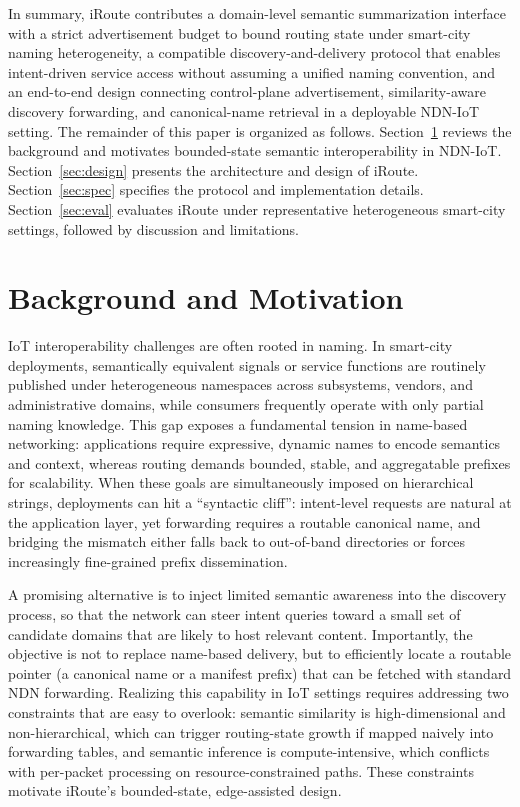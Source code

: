 \documentclass[journal]{IEEEtran}
\newcommand{\sysname}{iRoute}
\begin{document}
In summary, \sysname{} contributes a domain-level semantic summarization interface with a strict advertisement budget to bound routing state under smart-city naming heterogeneity, a compatible discovery-and-delivery protocol that enables intent-driven service access without assuming a unified naming convention, and an end-to-end design connecting control-plane advertisement, similarity-aware discovery forwarding, and canonical-name retrieval in a deployable NDN-IoT setting. The remainder of this paper is organized as follows. Section~\ref{sec:background} reviews the background and motivates bounded-state semantic interoperability in NDN-IoT. Section~\ref{sec:design} presents the architecture and design of \sysname{}. Section~\ref{sec:spec} specifies the protocol and implementation details. Section~\ref{sec:eval} evaluates \sysname{} under representative heterogeneous smart-city settings, followed by discussion and limitations.

\section{Background and Motivation}
\label{sec:background}

IoT interoperability challenges are often rooted in naming.
In smart-city deployments, semantically equivalent signals or service functions are routinely published under heterogeneous namespaces across subsystems, vendors, and administrative domains, while consumers frequently operate with only partial naming knowledge. This gap exposes a fundamental tension in name-based networking: applications require expressive, dynamic names to encode semantics and context, whereas routing demands bounded, stable, and aggregatable prefixes for scalability. When these goals are simultaneously imposed on hierarchical strings, deployments can hit a ``syntactic cliff'': intent-level requests are natural at the application layer, yet forwarding requires a routable canonical name, and bridging the mismatch either falls back to out-of-band directories or forces increasingly fine-grained prefix dissemination.

A promising alternative is to inject limited semantic awareness into the discovery process, so that the network can steer intent queries toward a small set of candidate domains that are likely to host relevant content. Importantly, the objective is not to replace name-based delivery, but to efficiently locate a routable pointer (a canonical name or a manifest prefix) that can be fetched with standard NDN forwarding. Realizing this capability in IoT settings requires addressing two constraints that are easy to overlook: semantic similarity is high-dimensional and non-hierarchical, which can trigger routing-state growth if mapped naively into forwarding tables, and semantic inference is compute-intensive, which conflicts with per-packet processing on resource-constrained paths. These constraints motivate iRoute's bounded-state, edge-assisted design.
\end{document}
